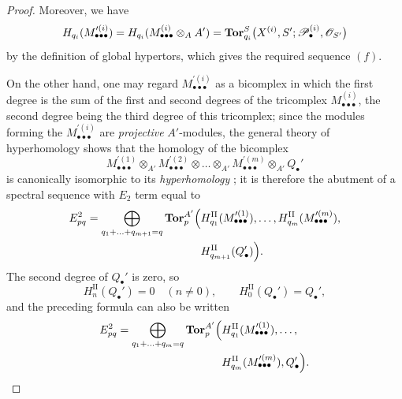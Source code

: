 \begin{proof}
Moreover, we have
\[
  H_{q_i}(M_{\bullet\bullet\bullet}^{\prime(i)})
  =
  H_{q_i}(M_{\bullet\bullet\bullet}^{(i)}\otimes_A A')
  =
  \mathbf{Tor}_{q_i}^S
  \bigl(
    X^{(i)},S';
    \mathscr{P}_\bullet^{(i)},\mathscr{O}_{S'}
  \bigr)
\]
by the definition of global hypertors, which gives the required sequence $(f)$.

On the other hand, one may regard
$M_{\bullet\bullet\bullet}^{\prime(i)}$ as a bicomplex in which the first
degree is the sum of the first and second degrees of the tricomplex
$M_{\bullet\bullet\bullet}^{(i)}$, the second degree being the third degree of
this tricomplex; since the modules forming the
$M_{\bullet\bullet\bullet}^{\prime(i)}$ are \emph{projective} $A'$-modules, the general theory of hyperhomology shows
that the homology of the bicomplex
\[
  M_{\bullet\bullet\bullet}^{\prime(1)}
  \otimes_{A'}
  M_{\bullet\bullet\bullet}^{\prime(2)}
  \otimes\ldots\otimes_{A'}
  M_{\bullet\bullet\bullet}^{\prime(m)}
  \otimes_{A'}Q_\bullet'
\]
is canonically isomorphic to its \emph{hyperhomology}
; it is therefore the abutment of a spectral
sequence with $E_2$ term equal to
\[
\begin{split}
  E_{pq}^2
  =
  \bigoplus_{q_1+\ldots+q_{m+1}=q}
  \mathbf{Tor}_p^{A'}
  \Bigl(
    &
    H_{q_1}^{\mathrm{II}}
    (M_{\bullet\bullet\bullet}^{\prime(1)}),\ldots,
    H_{q_m}^{\mathrm{II}}
    (M_{\bullet\bullet\bullet}^{\prime(m)}),
    \\
    &
    H_{q_{m+1}}^{\mathrm{II}}(Q_\bullet')
  \Bigr).
\end{split}
\]
The second degree of $Q_\bullet'$ is zero, so
\[
  H_n^{\mathrm{II}}(Q_\bullet')=0
  \quad(n\neq0),
  \qquad
  H_0^{\mathrm{II}}(Q_\bullet')=Q_\bullet',
\]
and the preceding formula can also be written
\[
\begin{split}
  E_{pq}^2
  =
  \bigoplus_{q_1+\ldots+q_m=q}
  \mathbf{Tor}_p^{A'}
  \Bigl(
    &
    H_{q_1}^{\mathrm{II}}
    (M_{\bullet\bullet\bullet}^{\prime(1)}),\ldots,
    \\
    &
    H_{q_m}^{\mathrm{II}}
    (M_{\bullet\bullet\bullet}^{\prime(m)}),
    Q_\bullet'
  \Bigr).
\end{split}
\]


\end{proof}

